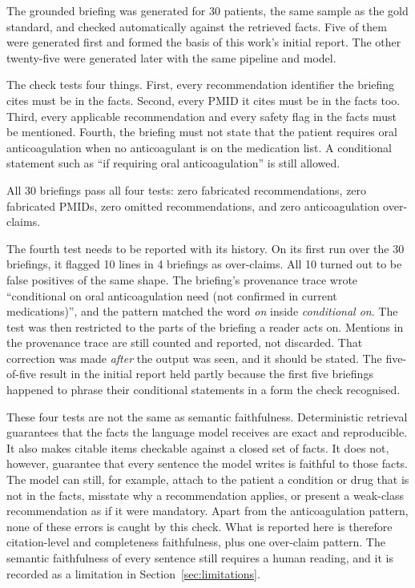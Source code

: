 The grounded briefing was generated for 30 patients, the same sample as the gold standard,
and checked automatically against the retrieved facts. Five of them were generated first and
formed the basis of this work's initial report. The other twenty-five were generated later
with the same pipeline and model.

The check tests four things. First, every recommendation identifier the briefing cites must
be in the facts. Second, every PMID it cites must be in the facts too. Third, every
applicable recommendation and every safety flag in the facts must be mentioned. Fourth, the
briefing must not state that the patient requires oral anticoagulation when no anticoagulant
is on the medication list. A conditional statement such as ``if requiring oral
anticoagulation'' is still allowed.

All 30 briefings pass all four tests: zero fabricated recommendations, zero fabricated PMIDs,
zero omitted recommendations, and zero anticoagulation over-claims.

The fourth test needs to be reported with its history. On its first run over the 30
briefings, it flagged 10 lines in 4 briefings as over-claims. All 10 turned out to be false
positives of the same shape. The briefing's provenance trace wrote ``conditional on oral
anticoagulation need (not confirmed in current medications)'', and the pattern matched the
word \emph{on} inside \emph{conditional on}. The test was then restricted to the parts of the
briefing a reader acts on. Mentions in the provenance trace are still counted and reported,
not discarded. That correction was made \emph{after} the output was seen, and it should be
stated. The five-of-five result in the initial report held partly because the first five
briefings happened to phrase their conditional statements in a form the check recognised.

These four tests are not the same as semantic faithfulness. Deterministic retrieval
guarantees that the facts the language model receives are exact and reproducible. It also
makes citable items checkable against a closed set of facts. It does not, however, guarantee
that every sentence the model writes is faithful to those facts. The model can still, for
example, attach to the patient a condition or drug that is not in the facts, misstate why a
recommendation applies, or present a weak-class recommendation as if it were mandatory.
Apart from the anticoagulation pattern, none of these errors is caught by this check. What is
reported here is therefore citation-level and completeness faithfulness, plus one over-claim
pattern. The semantic faithfulness of every sentence still requires a human reading, and it
is recorded as a limitation in Section~\ref{sec:limitations}.

